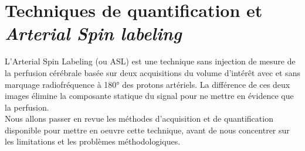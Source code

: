
\chapter{Techniques de quantification et {\em Arterial Spin labeling}}
\label{chap:asl}
	\minitoc


L’Arterial Spin Labeling (ou ASL) est une technique sans injection de mesure de la perfusion cérébrale basée sur deux acquisitions du volume d’intérêt avec et sans marquage radiofréquence à 180° des protons artériels. La différence de ces deux images élimine la composante statique du signal pour ne mettre en évidence que la perfusion.\\
Nous allons passer en revue les méthodes d’acquisition et de quantification disponible pour mettre en oeuvre cette technique, avant de nous concentrer sur les limitations et les problèmes méthodologiques.

